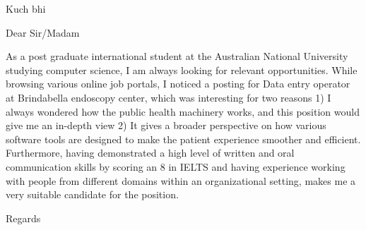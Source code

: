 \documentclass{letter}
\begin{document}
\begin{letter}{Kuch bhi }
\opening{Dear Sir/Madam}
	As a post graduate international student at the Australian National University studying computer science, I am always looking for relevant opportunities. While browsing various online job portals, I noticed a posting for Data entry operator at Brindabella endoscopy center, which was interesting for two reasons 1) I always wondered how the public health machinery works, and this position would give me an in-depth view 2) It gives a broader perspective on how various software tools are designed to make the patient experience smoother and efficient.
	Furthermore, having demonstrated a high level of written and oral communication skills by scoring an 8 in IELTS and having experience working with people from different domains within an organizational setting, makes me a very suitable candidate for the position.
	
\closing{Regards}
\end{letter}
\end{document}
